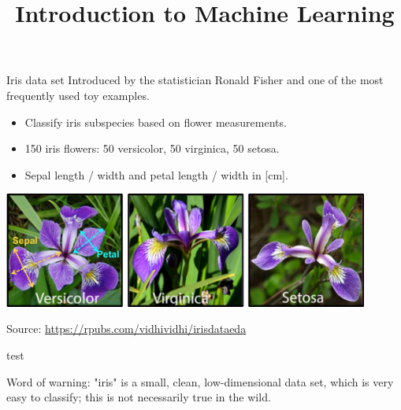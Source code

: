 




\newcommand{\titlefigure}{figure/sample-dgp-2d.pdf}
\newcommand{\learninggoals}{
\item Understand structure of tabular data in ML
\item Understand difference between target and features
\item Understand difference between labeled and unlabeled data
\item Know concept of data-generating process}

\title{Introduction to Machine Learning}
\date{}




\begin{vbframe}{Iris data set}
Introduced by the statistician Ronald Fisher and one
of the most frequently used toy examples.
\begin{itemize}
\item Classify iris subspecies based on flower measurements.
\item 150 iris flowers: 50 versicolor, 50 virginica, 50 setosa.
\item Sepal length / width and petal length / width in [cm].
\end{itemize}

\begin{center}
\includegraphics[width=0.9\textwidth]{figure_man/iris_species.png}

\tiny
Source: \url{https://rpubs.com/vidhividhi/irisdataeda}
\normalsize
\end{center}

test

Word of warning: "iris" is a small, clean, low-dimensional data set,
which is very easy to classify; this is not necessarily true in the wild.

\end{vbframe}

